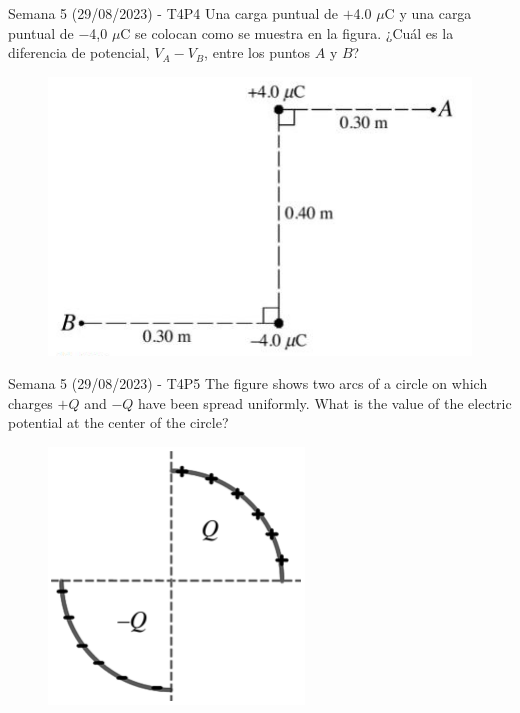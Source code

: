 \begin{frame}{Semana 5 (29/08/2023) - T4P4}
    Una carga puntual de $+$4.0 $\mu$C y una carga puntual de $-$4,0 $\mu$C se colocan como se muestra en la figura. ¿Cuál es la diferencia de potencial, $V_A-V_B$, entre los puntos $A$ y $B$?
    
    \begin{figure}
        \centering
        \includegraphics[scale=0.5]{figures/t4p4.png}
    \end{figure}
    
\end{frame}

\begin{frame}{Semana 5 (29/08/2023) - T4P5}
    The figure shows two arcs of a circle on which charges $+Q$ and $-Q$ have been spread uniformly. What is the value of the electric potential at the center of the circle?
    
    \begin{figure}
        \centering
        \includegraphics[scale=0.5]{figures/t4p5.png}
    \end{figure}
    
\end{frame}

